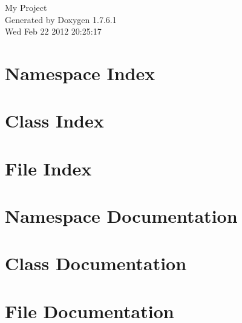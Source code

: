 \documentclass[a4paper]{book}
\begin{document}
\hypersetup{pageanchor=false,citecolor=blue}
\begin{titlepage}
\vspace*{7cm}
\begin{center}
{\Large \-My \-Project }\\
\vspace*{1cm}
{\large \-Generated by Doxygen 1.7.6.1}\\
\vspace*{0.5cm}
{\small Wed Feb 22 2012 20:25:17}\\
\end{center}
\end{titlepage}
\clearemptydoublepage
{}
\tableofcontents
\clearemptydoublepage
{}
\hypersetup{pageanchor=true,citecolor=blue}
\chapter{\-Namespace \-Index}

\chapter{\-Class \-Index}

\chapter{\-File \-Index}

\chapter{\-Namespace \-Documentation}


\chapter{\-Class \-Documentation}













\chapter{\-File \-Documentation}














\printindex
\end{document}

